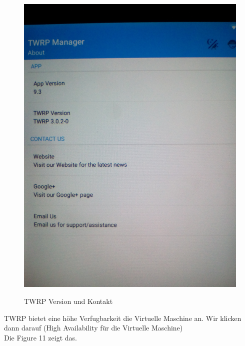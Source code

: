 \documentclass[11pt,a4paper]{article}
\begin{document}
\begin{figure}[H]
\begin{center} \includegraphics[scale=0.1]{./Image/img9}  \\
\caption{TWRP Version und Kontakt}
\end{center}
\end{figure} 

TWRP bietet eine höhe Verfugbarkeit die Virtuelle Maschine an. Wir klicken dann darauf (High Availability für die Virtuelle Maschine)\\

Die Figure 11 zeigt das.
\end{document}
